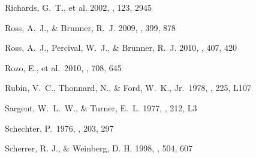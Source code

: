 \documentclass[]{emulateapj}
\begin{document}
\begin{thebibliography}{999}
Richards, G.\ T., et al. 2002, \aj, 123, 2945


Ross, A.\ J., \& Brunner, R.\ J. 2009, \mnras, 399, 878

Ross, A.\ J., Percival, W.\ J., \& Brunner, R.\ J. 2010, \mnras, 407, 420


Rozo, E., et al.\ 2010, \apj, 708, 645

Rubin, V.~C., Thonnard, N., \& Ford, W.~K., Jr.\ 1978, \apjl, 225, L107


Sargent, W.\ L.\ W., \& Turner, E.\ L. 1977, \apj, 212, L3


Schechter, P.\ 1976, \apj, 203, 297

Scherrer, R. J., \& Weinberg, D. H. 1998, \apj, 504, 607



\end{thebibliography}
\end{document}

